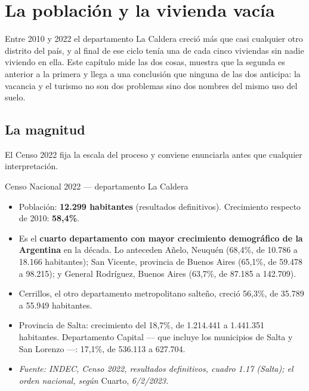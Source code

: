 \chapter{La población y la vivienda vacía}


\label{cap:poblacion}

Entre 2010 y 2022 el departamento La Caldera creció más que casi cualquier otro distrito
del país, y al final de ese ciclo tenía una de cada cinco viviendas sin nadie viviendo en
ella. Este capítulo mide las dos cosas, muestra que la segunda es anterior a la primera y
llega a una conclusión que ninguna de las dos anticipa: la vacancia y el turismo no son
dos problemas sino dos nombres del mismo uso del suelo.

\section{La magnitud}

El Censo 2022 fija la escala del proceso y conviene enunciarla antes que cualquier interpretación.

\begin{ficha}{Censo Nacional 2022 --- departamento La Caldera}
\begin{itemize}[leftmargin=*,nosep]
\item Población: \textbf{12.299 habitantes} (resultados definitivos). Crecimiento respecto de 2010: \textbf{58,4\%}.
\item Es el \textbf{cuarto departamento con mayor crecimiento demográfico de la Argentina} en la década. Lo anteceden Añelo, Neuquén (68,4\%, de 10.786 a 18.166 habitantes); San Vicente, provincia de Buenos Aires (65,1\%, de 59.478 a 98.215); y General Rodríguez, Buenos Aires (63,7\%, de 87.185 a 142.709).
\item Cerrillos, el otro departamento metropolitano salteño, creció 56,3\%, de 35.789 a 55.949 habitantes.
\item Provincia de Salta: crecimiento del 18,7\%, de 1.214.441 a 1.441.351 habitantes. Departamento Capital --- que incluye los municipios de Salta y San Lorenzo ---: 17,1\%, de 536.113 a 627.704.
\item \textit{Fuente: INDEC, Censo 2022, resultados definitivos, cuadro 1.17 (Salta); el orden nacional, según} Cuarto, \textit{6/2/2023.}
\end{itemize}
\end{ficha}


